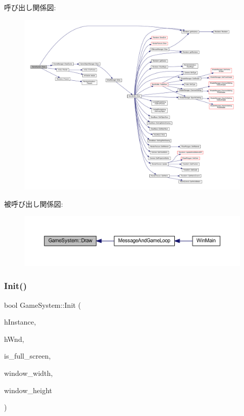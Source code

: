 呼び出し関係図\+:
\nopagebreak
\begin{figure}[H]
\begin{center}
\leavevmode
\includegraphics[width=350pt]{class_game_system_a474db0066b23d39e94e0a830140edce5_cgraph}
\end{center}
\end{figure}
被呼び出し関係図\+:\nopagebreak
\begin{figure}[H]
\begin{center}
\leavevmode
\includegraphics[width=350pt]{class_game_system_a474db0066b23d39e94e0a830140edce5_icgraph}
\end{center}
\end{figure}
\mbox{\label{class_game_system_ad4c08500b98490e00ce87a770bb5e981}} 
\subsubsection{\texorpdfstring{Init()}{Init()}}
{\footnotesize\ttfamily bool Game\+System\+::\+Init (\begin{DoxyParamCaption}\item[{H\+I\+N\+S\+T\+A\+N\+CE}]{h\+Instance,  }\item[{H\+W\+ND}]{h\+Wnd,  }\item[{B\+O\+OL}]{is\+\_\+full\+\_\+screen,  }\item[{int}]{window\+\_\+width,  }\item[{int}]{window\+\_\+height }\end{DoxyParamCaption})}



